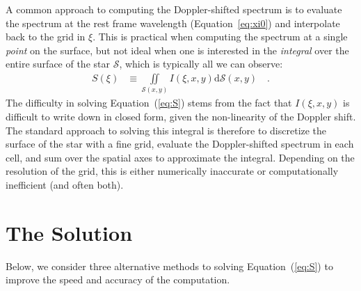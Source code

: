 \documentclass[modern]{aastex62}
\begin{document}
A common approach to computing the Doppler-shifted spectrum is to
evaluate the spectrum at the rest frame wavelength (Equation~\ref{eq:xi0})
and interpolate back to the grid in $\xi$. This is practical when
computing the spectrum at a single \emph{point} on the surface, but not
ideal when one is interested in the \emph{integral} over the entire
surface of the star $\mathcal{S}$, which is typically all we can observe:
%
\begin{align}
    \label{eq:S}
    S(\xi) 
        &\equiv
        \iint\limits_{\mathcal{S}(x, y)}
                I(\xi, x, y)
        \mathrm{d}{\mathcal{S}(x, y)}
        \quad .
\end{align}
%
The difficulty in solving Equation~(\ref{eq:S}) stems from the fact
that $I(\xi, x, y)$ is difficult to write down in closed form, given
the non-linearity of the Doppler shift.
The standard approach to solving this integral is therefore
to discretize the surface of the star with a fine grid, evaluate the
Doppler-shifted spectrum in each cell, and sum over the spatial axes
to approximate the integral. Depending on the resolution of the grid,
this is either numerically inaccurate or computationally inefficient 
(and often both).

\section{The Solution}

Below, we consider three alternative methods to solving
Equation~(\ref{eq:S}) to improve the speed and accuracy of the
computation.
\end{document}
